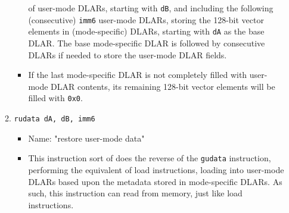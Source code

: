 \documentclass{article}
\begin{document}
\begin{itemize}
\begin{enumerate}
\begin{itemize}
					of user-mode DLARs, starting with \texttt{dB}, and
					including the following (consecutive) \texttt{imm6}
					user-mode DLARs, storing the 128-bit vector elements in
					(mode-specific) DLARs, starting with \texttt{dA} as the
					base DLAR.  The base mode-specific DLAR is followed by
					consecutive DLARs if needed to store the user-mode DLAR
					fields.
				\item If the last mode-specific DLAR is not completely
					filled with user-mode DLAR contents, its remaining
					128-bit vector elements will be filled with
					\texttt{0x0}.
				\end{itemize}
			\item \texttt{rudata dA, dB, imm6}
				\begin{itemize}
				\item Name:  "restore user-mode data"
				\item This instruction sort of does the reverse of the
					\texttt{gudata} instruction, performing the equivalent
					of load instructions, loading into user-mode DLARs
					based upon the metadata stored in mode-specific DLARs.
					As such, this instruction can read from memory, just
					like load instructions.
				\end{itemize}


\end{enumerate}
\end{itemize}
\end{document}
